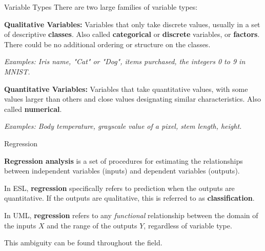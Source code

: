 \documentclass[10pt, handout]{beamer}
\begin{document}
\begin{frame}[fragile]{Variable Types}
There are two large families of variable types:\pause

\textbf{Qualitative Variables:} Variables that only take discrete values, usually in a set of descriptive \textbf{classes}. Also called \textbf{categorical} or \textbf{discrete} variables, or \textbf{factors}. There could be no additional ordering or structure on the classes.

\textit{Examples: Iris name, "Cat" or "Dog", items purchased, the integers 0 to 9 in MNIST.}

\vspace{3em}\pause


\textbf{Quantitative Variables:} Variables that take quantitative values, with some values larger than others and close values designating similar characteristics. Also called \textbf{numerical}.


\textit{Examples: Body temperature, grayscale value of a pixel, stem length, height.}\vspace{3em}
\end{frame}



\begin{frame}[fragile]{Regression}


\textbf{Regression analysis} is a set of procedures for estimating the relationships between independent variables (inputs) and dependent variables (outputs).

In ESL, \textbf{regression} specifically refers to prediction when the outputs are quantitative. If the outputs are qualitative, this is referred to as \textbf{classification}.

In UML, \textbf{regression} refers to any \textit{functional} relationship between the domain of the inputs $X$ and the range of the outputs $Y$, regardless of variable type.

This ambiguity can be found throughout the field. 
\end{frame}
\end{document}
